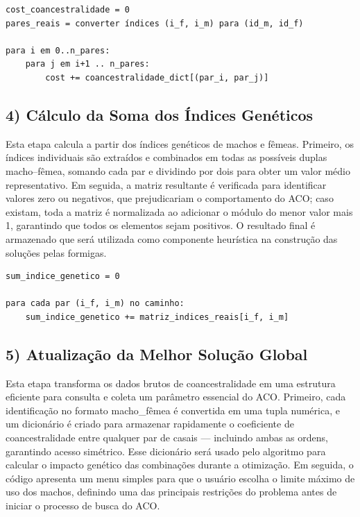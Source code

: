 \begin{verbatim}
cost_coancestralidade = 0
pares_reais = converter índices (i_f, i_m) para (id_m, id_f)

para i em 0..n_pares:
    para j em i+1 .. n_pares:
        cost += coancestralidade_dict[(par_i, par_j)]
\end{verbatim}
\vspace{1em}

\subsection*{4) Cálculo da Soma dos Índices Genéticos}
Esta etapa calcula a partir dos índices genéticos de machos e fêmeas. Primeiro, os índices individuais são extraídos e combinados em todas as possíveis duplas macho–fêmea, somando cada par e dividindo por dois para obter um valor médio representativo. Em seguida, a matriz resultante é verificada para identificar valores zero ou negativos, que prejudicariam o comportamento do ACO; caso existam, toda a matriz é normalizada ao adicionar o módulo do menor valor mais 1, garantindo que todos os elementos sejam positivos. O resultado final é armazenado que será utilizada como componente heurística na construção das soluções pelas formigas.

\begin{verbatim}
sum_indice_genetico = 0

para cada par (i_f, i_m) no caminho:
    sum_indice_genetico += matriz_indices_reais[i_f, i_m]
\end{verbatim}
\vspace{1em}

\subsection*{5) Atualização da Melhor Solução Global}
Esta etapa transforma os dados brutos de coancestralidade em uma estrutura eficiente para consulta e coleta um parâmetro essencial do ACO. Primeiro, cada identificação no formato macho\_fêmea é convertida em uma tupla numérica, e um dicionário é criado para armazenar rapidamente o coeficiente de coancestralidade entre qualquer par de casais — incluindo ambas as ordens, garantindo acesso simétrico. Esse dicionário será usado pelo algoritmo para calcular o impacto genético das combinações durante a otimização. Em seguida, o código apresenta um menu simples para que o usuário escolha o limite máximo de uso dos machos, definindo uma das principais restrições do problema antes de iniciar o processo de busca do ACO.

